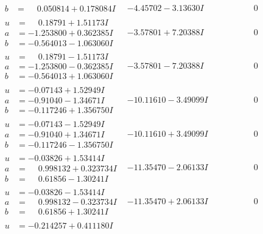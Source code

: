 \documentclass[1p]{elsarticle_modified}
\theoremstyle{definition}
\begin{document}
$$\begin{array}{c|c|c}
\begin{aligned}
b &= \phantom{-}0.050814 + 0.178084 I\end{aligned}
 & -4.45702 - 3.13630 I & \phantom{-0.000000 } 0 \\ \hline\begin{aligned}
u &= \phantom{-}0.18791 + 1.51173 I \\
a &= -1.253800 + 0.362385 I \\
b &= -0.564013 - 1.063060 I\end{aligned}
 & -3.57801 + 7.20388 I & \phantom{-0.000000 } 0 \\ \hline\begin{aligned}
u &= \phantom{-}0.18791 - 1.51173 I \\
a &= -1.253800 - 0.362385 I \\
b &= -0.564013 + 1.063060 I\end{aligned}
 & -3.57801 - 7.20388 I & \phantom{-0.000000 } 0 \\ \hline\begin{aligned}
u &= -0.07143 + 1.52949 I \\
a &= -0.91040 - 1.34671 I \\
b &= -0.117246 + 1.356750 I\end{aligned}
 & -10.11610 - 3.49099 I & \phantom{-0.000000 } 0 \\ \hline\begin{aligned}
u &= -0.07143 - 1.52949 I \\
a &= -0.91040 + 1.34671 I \\
b &= -0.117246 - 1.356750 I\end{aligned}
 & -10.11610 + 3.49099 I & \phantom{-0.000000 } 0 \\ \hline\begin{aligned}
u &= -0.03826 + 1.53414 I \\
a &= \phantom{-}0.998132 + 0.323734 I \\
b &= \phantom{-}0.61856 - 1.30241 I\end{aligned}
 & -11.35470 - 2.06133 I & \phantom{-0.000000 } 0 \\ \hline\begin{aligned}
u &= -0.03826 - 1.53414 I \\
a &= \phantom{-}0.998132 - 0.323734 I \\
b &= \phantom{-}0.61856 + 1.30241 I\end{aligned}
 & -11.35470 + 2.06133 I & \phantom{-0.000000 } 0 \\ \hline\begin{aligned}
u &= -0.214257 + 0.411180 I \\

\end{aligned}
\end{array}$$
\end{document}
